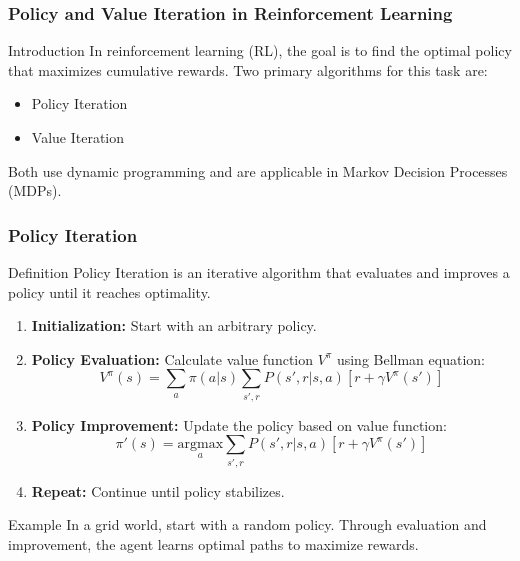 \documentclass[aspectratio=169]{beamer}
\begin{document}
\begin{frame}[fragile]
    \frametitle{Policy and Value Iteration in Reinforcement Learning}
    
    \begin{block}{Introduction}
        In reinforcement learning (RL), the goal is to find the optimal policy that maximizes cumulative rewards. 
        Two primary algorithms for this task are:
        \begin{itemize}
            \item Policy Iteration
            \item Value Iteration
        \end{itemize}
        Both use dynamic programming and are applicable in Markov Decision Processes (MDPs).
    \end{block}
\end{frame}

\begin{frame}[fragile]
    \frametitle{Policy Iteration}
    
    \begin{block}{Definition}
        Policy Iteration is an iterative algorithm that evaluates and improves a policy until it reaches optimality.
    \end{block}
    
    \begin{enumerate}
        \item \textbf{Initialization:} Start with an arbitrary policy.
        \item \textbf{Policy Evaluation:} Calculate value function $V^\pi$ using Bellman equation:
        \begin{equation}
            V^\pi(s) = \sum_{a} \pi(a|s) \sum_{s', r} P(s', r | s, a) [r + \gamma V^\pi(s')]
        \end{equation}
        \item \textbf{Policy Improvement:} Update the policy based on value function:
        \begin{equation}
            \pi'(s) = \underset{a}{\text{argmax}} \sum_{s', r} P(s', r | s, a) [r + \gamma V^\pi(s')]
        \end{equation}
        \item \textbf{Repeat:} Continue until policy stabilizes.
    \end{enumerate}

    \begin{block}{Example}
        In a grid world, start with a random policy. Through evaluation and improvement, the agent learns optimal paths to maximize rewards.
    \end{block}   
\end{frame}
\end{document}
